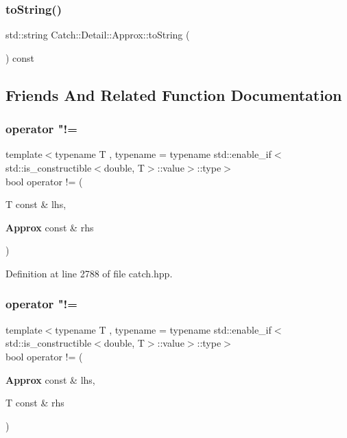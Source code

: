 \mbox{\label{class_catch_1_1_detail_1_1_approx_a972fd9ac60607483263f1b0f0f9955e6}} 
\subsubsection{toString()}
{\footnotesize\ttfamily std\+::string Catch\+::\+Detail\+::\+Approx\+::to\+String (\begin{DoxyParamCaption}{ }\end{DoxyParamCaption}) const}



\subsection{Friends And Related Function Documentation}
\mbox{\label{class_catch_1_1_detail_1_1_approx_ad878de1a82eb134e32d3434bb3fddd54}} 
\subsubsection{operator "!=\hspace{0.1cm}{\footnotesize\ttfamily [1/2]}}
{\footnotesize\ttfamily template$<$typename T , typename  = typename std\+::enable\+\_\+if$<$std\+::is\+\_\+constructible$<$double, T$>$\+::value$>$\+::type$>$ \\
bool operator != (\begin{DoxyParamCaption}\item[{T const \&}]{lhs,  }\item[{\textbf{ Approx} const \&}]{rhs }\end{DoxyParamCaption})\hspace{0.3cm}{\ttfamily [friend]}}



Definition at line 2788 of file catch.\+hpp.

\mbox{\label{class_catch_1_1_detail_1_1_approx_a0902653024d8e11e76632b2faa1f6bd5}} 
\subsubsection{operator "!=\hspace{0.1cm}{\footnotesize\ttfamily [2/2]}}
{\footnotesize\ttfamily template$<$typename T , typename  = typename std\+::enable\+\_\+if$<$std\+::is\+\_\+constructible$<$double, T$>$\+::value$>$\+::type$>$ \\
bool operator != (\begin{DoxyParamCaption}\item[{\textbf{ Approx} const \&}]{lhs,  }\item[{T const \&}]{rhs }\end{DoxyParamCaption})\hspace{0.3cm}{\ttfamily [friend]}}



